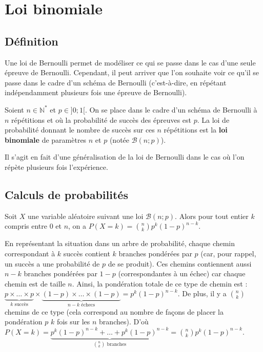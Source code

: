 	\section{Loi binomiale}

	\subsection{Définition}

	Une loi de Bernoulli permet de modéliser ce qui se passe dans le cas d'une seule épreuve de Bernoulli. Cependant, il peut arriver que l'on souhaite voir ce qu'il se passe dans le cadre d'un schéma de Bernoulli (c'est-à-dire, en répétant indépendamment plusieurs fois une épreuve de Bernoulli).

	\begin{formula}[Définition]
		Soient $n \in \mathbb{N}^*$ et $p \in ]0; 1[$. On se place dans le cadre d'un schéma de Bernoulli à $n$ répétitions et où la probabilité de succès des épreuves est $p$.
		\newpar
		La loi de probabilité donnant le nombre de succès sur ces $n$ répétitions est la \textbf{loi binomiale} de paramètres $n$ et $p$ (notée $\mathcal{B}(n; p)$).
	\end{formula}

	\begin{tip}
		Il s'agit en fait d'une généralisation de la loi de Bernoulli dans le cas où l'on répète plusieurs fois l'expérience.
	\end{tip}

	\subsection{Calculs de probabilités}

	\begin{formula}
		Soit $X$ une variable aléatoire suivant une loi $\mathcal{B}(n; p)$. Alors pour tout entier $k$ compris entre $0$ et $n$, on a $\displaystyle{P(X = k) = \binom{n}{k} p^k (1-p)^{n-k}}$.
	\end{formula}

	\begin{demonstration}
		\contentwidth[big]
		En représentant la situation dans un arbre de probabilité, chaque chemin correspondant à $k$ succès contient $k$ branches pondérées par $p$ (car, pour rappel, un succès a une probabilité de $p$ de se produit). Ces chemins contiennent aussi $n-k$ branches pondérées par $1-p$ (correspondantes à un échec) car chaque chemin est de taille $n$. Ainsi, la pondération totale de ce type de chemin est :
		\newpar
		$\underbrace{p \times \dots \times p}_{k \text{ succès}} \times \underbrace{(1-p) \times \dots \times (1-p)}_{n-k \text{ échecs}} = p^k(1-p)^{n-k}$.
		\newpar
		De plus, il y a $\displaystyle{\binom{n}{k}}$ chemins de ce type (cela correspond au nombre de façons de placer la pondération $p$ $k$ fois sur les $n$ branches).
		\newpar
		D'où $\displaystyle{P(X = k) = \underbrace{p^k(1-p)^{n-k} + \dots + p^k(1-p)^{n-k}}_{\binom{n}{k} \text{ branches}} = \binom{n}{k} p^k(1-p)^{n-k}}$.
	\end{demonstration}

